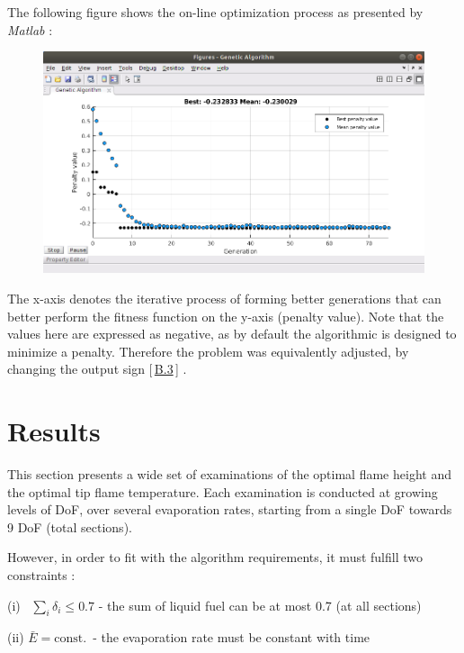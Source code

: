 \documentclass[12pt]{article}
\numberwithin{equation}{section}
\begin{document}
\begin{flushleft}
The following figure shows the on-line optimization process as presented by \textit{Matlab} : \vspace{0.5cm}

\begin{figure}[H]
\centering
\includegraphics[width=1.0 \linewidth, center]{Optimization_2.png}
\end{figure}

The x-axis denotes the iterative process of forming better generations that can better perform the fitness function on the y-axis (penalty value). Note that the values here are expressed as negative, as by default the algorithmic is designed to minimize a penalty. Therefore the problem was equivalently adjusted, by changing the output sign [\,\hyperlink{convex_concave}{B.3}\,] .
\newpage


\section{Results}
This section presents a wide set of examinations of the optimal flame height and the optimal tip flame temperature. Each examination is conducted at growing levels of DoF, over several evaporation rates, starting from a single DoF towards 9 DoF (total sections). 

However, in order to fit with the algorithm requirements, it must fulfill two constraints : 

\quad (i) \ $\sum_i \delta_i \leq 0.7$ - the sum of liquid fuel can be at most 0.7 (at all sections) 

\quad (ii) $\bar{E}=\text{const.}$ \,- the evaporation rate must be constant with time


\end{flushleft}
\end{document}
